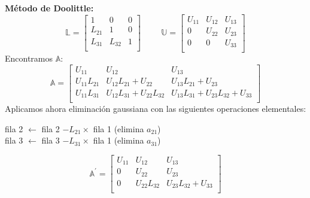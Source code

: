 \documentclass[9pt, aspectratio=169]{beamer}
\begin{document}
\begin{frame}
	\textbf{Método de Doolittle:}
	\begin{equation*}
		\mathbb{L} = \left[
			\begin{array}{ccc}
				1      & 0      & 0 \\
				L_{21} & 1      & 0 \\
				L_{31} & L_{32} & 1 \\
			\end{array} \right] \hspace{1cm}
		\mathbb{U} = \left[
			\begin{array}{ccc}
				U_{11} & U_{12} & U_{13} \\
				0      & U_{22} & U_{23} \\
				0      & 0      & U_{33} \\
			\end{array} \right]
	\end{equation*}
	Encontramos $\mathbb{A}$:
	\begin{equation*}
		\mathbb{A}= \left[ \begin{array}{lll}
				U_{11}        & U_{12}                     & U_{13}                               \\
				U_{11} L_{21} & U_{12} L_{21}+U_{22}       & U_{13} L_{21} + U_{23}               \\
				U_{11} L_{31} & U_{12} L_{31}+U_{22}L_{32} & U_{13} L_{31}+U_{23} L_{32} + U_{33} \\
			\end{array} \right]
	\end{equation*} \pause
	Aplicamos ahora eliminación gaussiana con las siguientes operaciones elementales:
	\begin{center}
		fila 2 $\leftarrow$ fila 2 $- L_{21} \times$ fila 1 (elimina $a_{21}$) \\
		fila 3 $\leftarrow$ fila 3 $- L_{31} \times$ fila 1 (elimina $a_{31}$)
	\end{center}
	\begin{equation*}
		\mathbb{A}^{\prime}= \left[ \begin{array}{ccc}
				U_{11} & U_{12}       & U_{13}                 \\
				0      & U_{22}       & U_{23}                 \\
				0      & U_{22}L_{32} & U_{23} L_{32} + U_{33} \\
			\end{array} \right]
	\end{equation*}
\end{frame}
\end{document}
